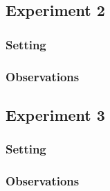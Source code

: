 \documentclass[11pt]{article}
\begin{document}
\begin{figure}
\begin{adjustbox}{width=\textwidth,center}
\begin{tabular}{c c}
    \end{tabular}
  \end{adjustbox}
  \caption{}
\end{figure}

\subsection{Experiment 2}

\subsubsection{Setting}

\subsubsection{Observations}

\subsection{Experiment 3}
\label{sec:experiment3}

\subsubsection{Setting}

\subsubsection{Observations}
\end{document}
